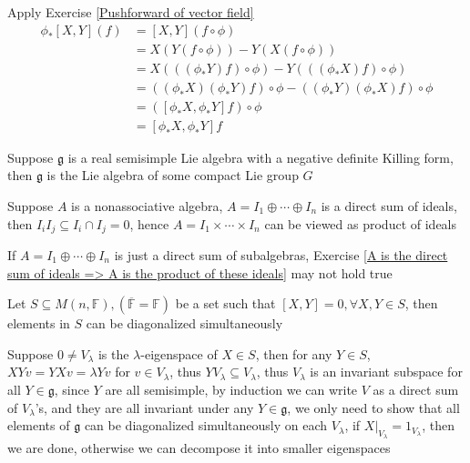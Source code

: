 \documentclass[main]{subfiles}
\begin{document}
\begin{solution}
Apply Exercise \ref{Pushforward of vector field} \begin{align*}
\phi_*[X,Y](f)&=[X,Y](f\circ\phi) \\
&=X(Y(f\circ\phi))-Y(X(f\circ\phi)) \\
&=X(((\phi_*Y)f)\circ\phi)-Y(((\phi_*X)f)\circ\phi) \\
&=((\phi_*X)(\phi_*Y)f)\circ\phi-((\phi_*Y)(\phi_*X)f)\circ\phi \\
&=([\phi_*X,\phi_*Y]f)\circ\phi \\
&=[\phi_*X,\phi_*Y]f
\end{align*}
\end{solution}

\begin{exercise}
Suppose $\mathfrak g$ is a real semisimple Lie algebra with a negative definite Killing form, then $\mathfrak g$ is the Lie algebra of some compact Lie group $G$
\end{exercise}

\begin{exercise}\label{A is the direct sum of ideals => A is the product of these ideals}
Suppose $A$ is a nonassociative algebra, $A=I_1\oplus\cdots\oplus I_n$ is a direct sum of ideals, then $I_iI_j\subseteq I_i\cap I_j=0$, hence $A=I_1\times\cdots\times I_n$ can be viewed as product of ideals
\end{exercise}

\begin{remark}
If $A=I_1\oplus\cdots\oplus I_n$ is just a direct sum of subalgebras, Exercise \ref{A is the direct sum of ideals => A is the product of these ideals} may not hold true
\end{remark}

\begin{exercise}\label{Pairwise commuting matrices can be diagonalized simultaneously}
Let $S\subseteq M(n,\mathbb F),(\overline{\mathbb F}=\mathbb F)$ be a set such that $[X,Y]=0,\forall X,Y\in S$, then elements in $S$ can be diagonalized simultaneously
\end{exercise}

\begin{solution}
Suppose $0\neq V_\lambda$ is the $\lambda$-eigenspace of $X\in S$, then for any $Y\in S$, $XYv=YXv=\lambda Yv$ for $v\in V_\lambda$, thus $YV_\lambda\subseteq V_\lambda$, thus $V_\lambda$ is an invariant subspace for all $Y\in\mathfrak g$, since $Y$ are all semisimple, by induction we can write $V$ as a direct sum of $V_\lambda$'s, and they are all invariant under any $Y\in\mathfrak g$, we only need to show that all elements of $\mathfrak{g}$ can be diagonalized simultaneously on each $V_\lambda$, if $X|_{V_\lambda}=1_{V_\lambda}$, then we are done, otherwise we can decompose it into smaller eigenspaces
\end{solution}
\end{document}
